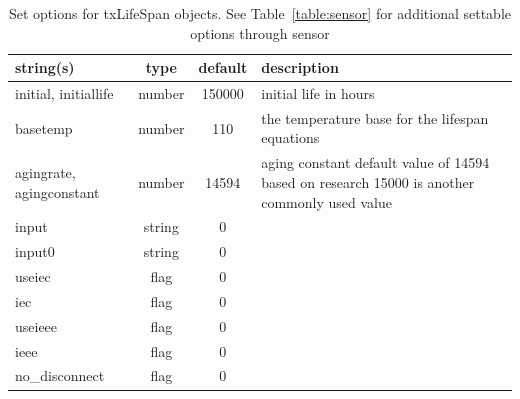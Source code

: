 \begin{table}[ht]
\centering
\begin{tabular}{p{5cm} c c p{7cm}}
\hline
string(s) & type & default & description \\
\hline
initial, initiallife & number & 150000 & initial life in hours\\
basetemp & number & 110 & the temperature base for the lifespan equations\\
agingrate, agingconstant & number & 14594 & aging constant default value of 14594 based on research 15000 is another commonly used value\\
input & string & 0 & \\
input0 & string & 0 & \\
useiec & flag & 0 & \\
iec & flag & 0 & \\
useieee & flag & 0 & \\
ieee & flag & 0 & \\
no\_disconnect & flag & 0 & \\
\hline
\end{tabular}
\caption{Set options for txLifeSpan objects. See Table~\ref{table:sensor} for additional settable options through sensor}
\label{table:txLifeSpan}
\end{table}
